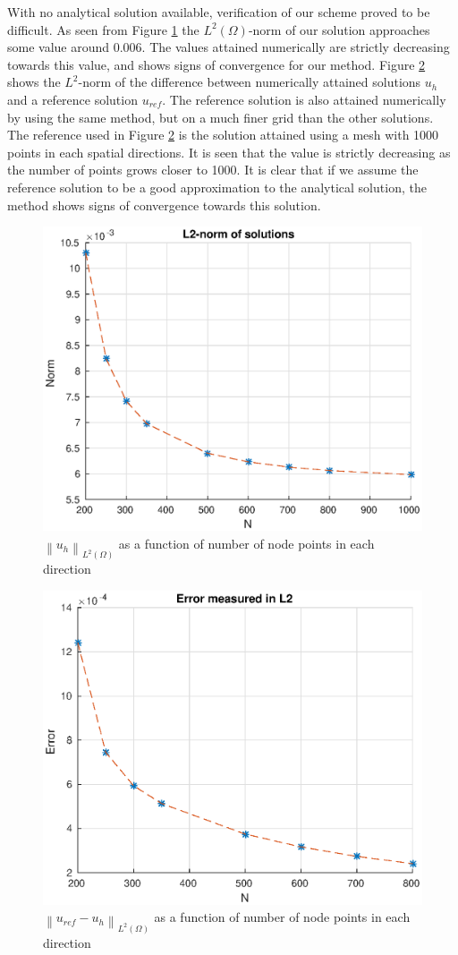 \documentclass[10pt,a4paper]{article}
\newcommand{\vectornorm}[1]{\left\|#1\right\|}
\begin{document}
With no analytical solution available, verification of our scheme proved to be difficult. As seen from Figure \ref{L2sol} the $L^2(\Omega)$-norm of our solution approaches some value around 0.006. The values attained numerically are strictly decreasing towards this value, and shows signs of convergence for our method. Figure \ref{L2error} shows the $L^2$-norm of the difference between numerically attained solutions $u_h$ and a reference solution $u_{ref}$. The reference solution is also attained numerically by using the same method, but on a much finer grid than the other solutions. The reference used in Figure \ref{L2error} is the solution attained using a mesh with 1000 points in each spatial directions. It is seen that the value is strictly decreasing as the number of points grows closer to 1000. It is clear that if we assume the reference solution to be a good approximation to the analytical solution, the method shows signs of convergence towards this solution.
\begin{figure}
    \centering
    \includegraphics[scale=0.8]{figures/L2solutions}
    \caption{$\vectornorm{u_h}_{L^2(\Omega)}$ as a function of number of node points in each direction}
    \label{L2sol}
\end{figure} 

\begin{figure}
    \centering
    \includegraphics[scale=0.8]{figures/L2_error}
    \caption{$\vectornorm{u_{ref} - u_h}_{L^2(\Omega)}$ as a function of number of node points in each direction}
    \label{L2error}
\end{figure}
\end{document}
